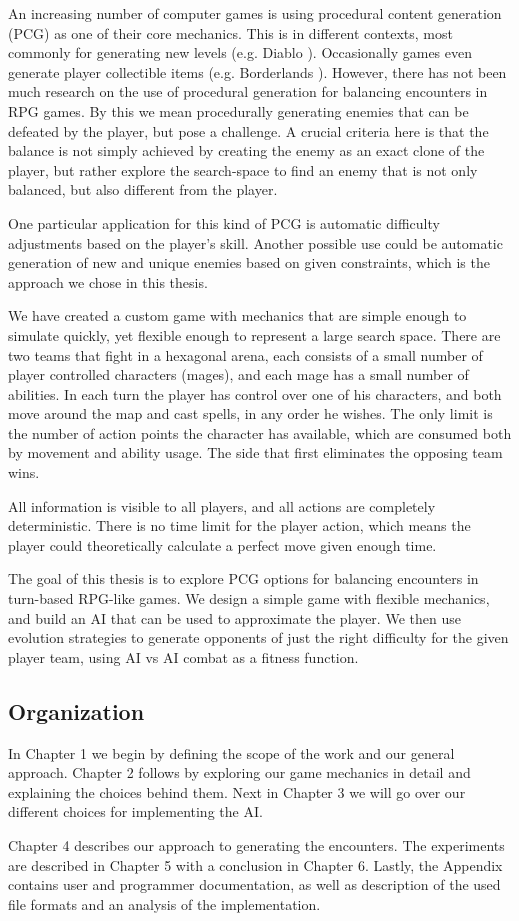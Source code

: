 
An increasing number of computer games is using procedural content generation
(PCG) as one of their core mechanics. This is in different contexts, most
commonly for generating new levels (e.g. Diablo \citep{diablo}). Occasionally games
even generate player collectible items (e.g. Borderlands \citep{borderlands}). However,
there has not been much research on the use of procedural generation for
balancing encounters in RPG games. By this we mean procedurally generating
enemies that can be defeated by the player, but pose a challenge. A crucial
criteria here is that the balance is not simply achieved by creating the enemy
as an exact clone of the player, but rather explore the search-space to find an
enemy that is not only balanced, but also different from the player.

One particular application for this kind of PCG is automatic difficulty
adjustments based on the player's skill. Another possible use could be
automatic generation of new and unique enemies based on given constraints,
which is the approach we chose in this thesis.

We have created a custom game with mechanics that are simple enough to simulate
quickly, yet flexible enough to represent a large search space. There are two
teams that fight in a hexagonal arena, each consists of a small number of
player controlled characters (mages), and each mage has a small number of
abilities. In each turn the player has control over one of his characters, and
both move around the map and cast spells, in any order he wishes. The only
limit is the number of action points the character has available, which are
consumed both by movement and ability usage. The side that first eliminates the
opposing team wins.

All information is visible to all players, and all actions are completely
deterministic. There is no time limit for the player action, which means the
player could theoretically calculate a perfect move given enough time.

The goal of this thesis is to explore PCG options for balancing encounters in
turn-based RPG-like games. We design a simple game with flexible mechanics, and
build an AI that can be used to approximate the player. We then use evolution strategies
to generate opponents of just the right difficulty for the given player team, using AI vs
AI combat as a fitness function.

\subsection*{Organization}

In Chapter 1 we begin by defining the scope of the work and our general approach. Chapter 2 follows by exploring our game mechanics in detail and explaining the choices behind them. Next in Chapter 3 we will go
over our different choices for implementing the AI.

Chapter 4 describes our approach to generating the encounters. The experiments are described in Chapter 5 with a conclusion in Chapter 6. Lastly, the Appendix contains user and programmer documentation, as well as description of the used file formats and an analysis of the implementation.
